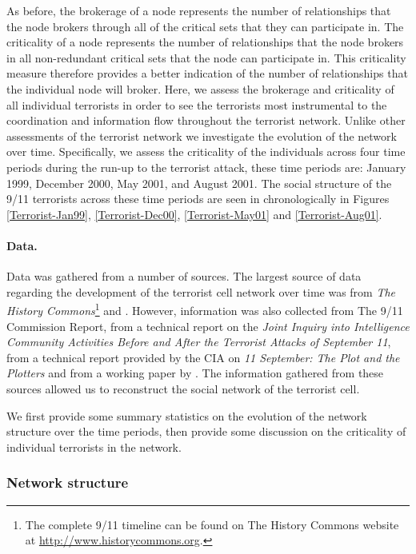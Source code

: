 As before, the brokerage of a node represents the number of relationships that the node brokers through all of the critical sets that they can participate in. The criticality of a node represents the number of relationships that the node brokers in all non-redundant critical sets that the node can participate in. This criticality measure therefore provides a better indication of the number of relationships that the individual node will broker. Here, we assess the brokerage and criticality of all individual terrorists in order to see the terrorists most instrumental to the coordination and information flow throughout the terrorist network. Unlike other assessments of the terrorist network \citep{Krebs2002, Farley2003, Lindelauf2013, Flores2014} we investigate the evolution of the network over time. Specifically, we assess the criticality of the individuals across four time periods during the run-up to the terrorist attack, these time periods are: January 1999, December 2000, May 2001, and August 2001. The social structure of the 9/11 terrorists across these time periods are seen in chronologically in Figures \ref{Terrorist-Jan99}, \ref{Terrorist-Dec00}, \ref{Terrorist-May01} and \ref{Terrorist-Aug01}.

\paragraph{Data.}

Data was gathered from a number of sources. The largest source of data regarding the development of the terrorist cell network over time was from \emph{The History Commons}\footnote{The complete 9/11 timeline can be found on The History Commons website at \href{http://www.historycommons.org}{http://www.historycommons.org}.} and \citet{Thompson2004}. However, information was also collected from The 9/11 Commission Report, from a technical report on the \emph{Joint Inquiry into Intelligence Community Activities Before and After the Terrorist Attacks of September 11}, from a technical report provided by the CIA on \emph{11 September: The Plot and the Plotters} and from a working paper by \citet{MassonWilkins2013}. The information gathered from these sources allowed us to reconstruct the social network of the terrorist cell.

We first provide some summary statistics on the evolution of the network structure over the time periods, then provide some discussion on the criticality of individual terrorists in the network.

\subsubsection*{Network structure}

